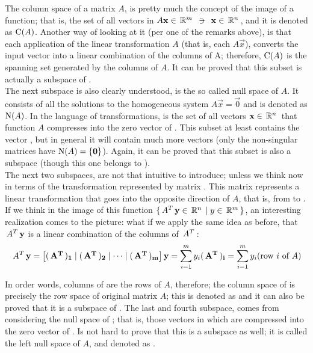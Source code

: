 The column space of a matrix $A$, is pretty much the concept of the
image of a function; that is, the set of all vectors in 
$A\vec{x} \in \R{m} \suchthat \vec{x} \in \R{n}$, and it is denoted as
$\operatorname{C}(A)$. Another way of looking at it (per one of the remarks above),
is that each application 
of the linear transformation $A$ (that is, each $A\vec{x}$), converts
the input vector  into a linear combination of the columns of
A; therefore, $\operatorname{C}(A)$ is the spanning set generated by the
columns of $A$. It can be proved that this subset is actually a
subspace of . \\

The next subspace is also clearly understood, is the so called
null space of $A$. It consists of all the solutions to the homogeneous
system $A\vec{x} = \vec{0}$ and is denoted as $\operatorname{N}(A)$. In the
language of transformations, is the set 
of all vectors $\mathbf{x} \in \,\mathbb{R}^{n}\,$ that function $A$ compresses into the zero
vector of . This subset at least contains the vector , but
in general it will contain much more vectors (only the non-singular
matrices have $\operatorname{N}(A) = \{\mathbf{0}\}$). Again, it can be proved
that this subset is also a subspace (though this one belongs to ). \\

The next two subspaces, are not that intuitive to introduce; unless we
think now in terms of the transformation represented by matrix
. This matrix represents a linear transformation that goes
into the opposite direction of $A$, that is, from  to . If
we think in the image of this function $\{\,{A}^{T}\,\mathbf{y} \in \,\mathbb{R}^{n}\, \mid
y \in \,\mathbb{R}^{m}\, \}$, an interesting realization comes to the picture: what if we
apply the same idea as before, that $\,{A}^{T}\,\mathbf{y}$ is a linear
combination of the columns of $\,{A}^{T}\,$: \\

\[
\,{A}^{T}\,\mathbf{y} = 
\begin{bmatrix}
  \mathbf{(\,{A}^{T}\,)_1} \mid \mathbf{(\,{A}^{T}\,)_2} \mid \cdots \mid \mathbf{(\,{A}^{T}\,)_m}
\end{bmatrix} \mathbf{y} = 
\sum_{i=1}^m y_i \mathbf{(\,{A}^{T}\,)_i} = 
\sum_{i=1}^m y_i (\text{row $i$ of $A$})
\]
\hfill

In order words, columns of  are the rows of $A$, therefore;
the column space of  is precisely the row space of original
matrix $A$; this is denoted as  and it can also
be proved that it is a subspace of . The last and fourth
subspace, comes from considering the null space of ; that is,
those vectors  in  which are compressed into the zero
vector of . Is not hard to prove that this is a subspace as
well; it is called the left null space of $A$, and denoted as
. \\

